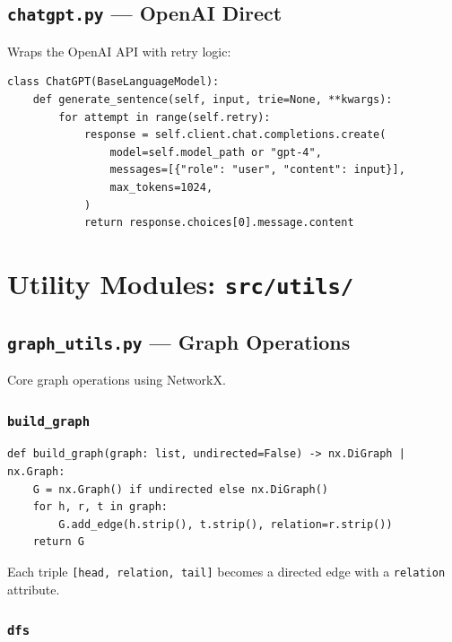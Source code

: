 \documentclass[11pt,a4paper,oneside,openany]{book}
\theoremstyle{definition}
\newcommand{\code}[1]{\texttt{#1}}
\begin{document}
\section{\texttt{chatgpt.py} --- OpenAI Direct}

Wraps the OpenAI API with retry logic:

\begin{lstlisting}
class ChatGPT(BaseLanguageModel):
    def generate_sentence(self, input, trie=None, **kwargs):
        for attempt in range(self.retry):
            response = self.client.chat.completions.create(
                model=self.model_path or "gpt-4",
                messages=[{"role": "user", "content": input}],
                max_tokens=1024,
            )
            return response.choices[0].message.content
\end{lstlisting}

\chapter{Utility Modules: \texttt{src/utils/}}\label{ch:utils}

\section{\texttt{graph\_utils.py} --- Graph Operations}

Core graph operations using NetworkX.

\subsection{\texttt{build\_graph}}

\begin{lstlisting}
def build_graph(graph: list, undirected=False) -> nx.DiGraph | nx.Graph:
    G = nx.Graph() if undirected else nx.DiGraph()
    for h, r, t in graph:
        G.add_edge(h.strip(), t.strip(), relation=r.strip())
    return G
\end{lstlisting}

Each triple \code{[head, relation, tail]} becomes a directed edge with a \code{relation} attribute.

\subsection{\texttt{dfs}}
\end{document}
